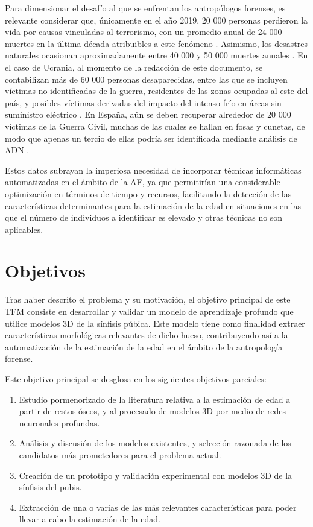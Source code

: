 Para dimensionar el desafío al que se enfrentan los antropólogos forenses, es relevante considerar que, únicamente en el año 2019, 20 000 personas perdieron la vida por causas vinculadas al terrorismo, con un promedio anual de 24 000 muertes en la última década atribuibles a este fenómeno \cite{owid_terrorism}. Asimismo, los desastres naturales ocasionan aproximadamente entre 40 000 y 50 000 muertes anuales \cite{owid_natural_disasters}. En el caso de Ucrania, al momento de la redacción de este documento, se contabilizan más de 60 000 personas desaparecidas, entre las que se incluyen víctimas no identificadas de la guerra, residentes de las zonas ocupadas al este del país, y posibles víctimas derivadas del impacto del intenso frío en áreas sin suministro eléctrico \cite{blanco_ucrania_2024}. En España, aún se deben recuperar alrededor de 20 000 víctimas de la Guerra Civil, muchas de las cuales se hallan en fosas y cunetas, de modo que apenas un tercio de ellas podría ser identificada mediante análisis de ADN \cite{junquera_huellas_2022}.

Estos datos subrayan la imperiosa necesidad de incorporar técnicas informáticas automatizadas en el ámbito de la AF, ya que permitirían una considerable optimización en términos de tiempo y recursos, facilitando la detección de las características determinantes para la estimación de la edad en situaciones en las que el número de individuos a identificar es elevado y otras técnicas no son aplicables.

\section{Objetivos}
Tras haber descrito el problema y su motivación, el objetivo principal de este TFM consiste en desarrollar y validar un modelo de aprendizaje profundo que utilice modelos 3D de la sínfisis púbica. Este modelo tiene como finalidad extraer características morfológicas relevantes de dicho hueso, contribuyendo así a la automatización de la estimación de la edad en el ámbito de la antropología forense.

Este objetivo principal se desglosa en los siguientes objetivos parciales:
\begin{enumerate}
    \item Estudio pormenorizado de la literatura relativa a la estimación de edad a partir de restos óseos, y al procesado de modelos 3D por medio de redes neuronales profundas.
    \item Análisis y discusión de los modelos existentes, y selección razonada de los candidatos más prometedores para el problema actual.
    \item Creación de un prototipo y validación experimental con modelos 3D de la sínfisis del pubis.
    \item Extracción de una o varias de las más relevantes características para poder llevar a cabo la estimación de la edad. 
\end{enumerate}
